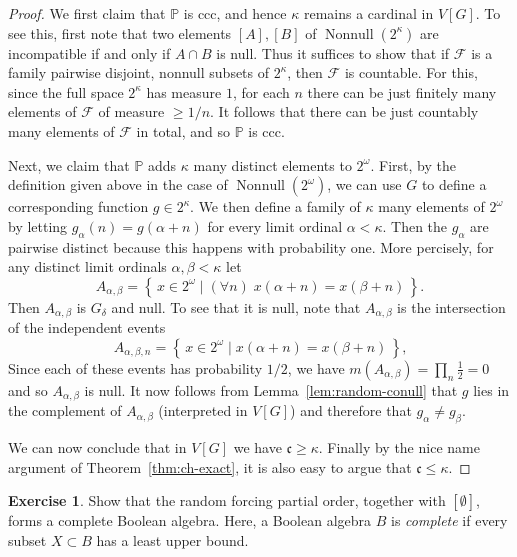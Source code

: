 \documentclass[11pt,oneside]{amsbook}
\newcommand{\set}[1]{\left\{\,#1\,\right\}}
\newcommand{\PP}{\mathbb P}
\DeclareMathOperator{\Nonnull}{Nonnull}
\theoremstyle{definition}
\newtheorem{exercise}{Exercise}[section]
\theoremstyle{plain}
\theoremstyle{definition}
\theoremstyle{remark}
\numberwithin{equation}{section}
\numberwithin{figure}{section}
\begin{document}
\begin{proof}
  We first claim that $\PP$ is ccc, and hence $\kappa$ remains a cardinal in $V[G]$. To see this, first note that two elements $[A],[B]$ of $\Nonnull(2^\kappa)$ are incompatible if and only if $A\cap B$ is null. Thus it suffices to show that if $\mathcal F$ is a family pairwise disjoint, nonnull subsets of $2^\kappa$, then $\mathcal F$ is countable. For this, since the full space $2^\kappa$ has measure $1$, for each $n$ there can be just finitely many elements of $\mathcal F$ of measure $\geq1/n$. It follows that there can be just countably many elements of $\mathcal F$ in total, and so $\PP$ is ccc.

  Next, we claim that $\PP$ adds $\kappa$ many distinct elements to $2^\omega$. First, by the definition given above in the case of $\Nonnull(2^\omega)$, we can use $G$ to define a corresponding function $g\in2^\kappa$. We then define a family of $\kappa$ many elements of $2^\omega$ by letting $g_\alpha(n)=g(\alpha+n)$ for every limit ordinal $\alpha<\kappa$. Then the $g_\alpha$ are pairwise distinct because this happens with probability one. More percisely, for any distinct limit ordinals $\alpha,\beta<\kappa$ let
  \[A_{\alpha,\beta}=\set{x\in2^\omega\mid(\forall n)\;x(\alpha+n)=x(\beta+n)}\text{.}
  \]
  Then $A_{\alpha,\beta}$ is $G_\delta$ and null. To see that it is null, note that $A_{\alpha,\beta}$ is the intersection of the independent events
  \[A_{\alpha,\beta,n}=\set{x\in2^\omega\mid x(\alpha+n)=x(\beta+n)}\text{,}
  \]
  Since each of these events has probability $1/2$, we have $m(A_{\alpha,\beta})=\prod_n\frac12=0$ and so $A_{\alpha,\beta}$ is null. It now follows from Lemma~\ref{lem:random-conull} that $g$ lies in the complement of $A_{\alpha,\beta}$ (interpreted in $V[G]$) and therefore that $g_\alpha\neq g_\beta$.

  We can now conclude that in $V[G]$ we have $\mathfrak c\geq\kappa$. Finally by the nice name argument of Theorem~\ref{thm:ch-exact}, it is also easy to argue that $\mathfrak c\leq\kappa$.
\end{proof}

\begin{exercise}
  Show that the random forcing partial order, together with $[\emptyset]$, forms a complete Boolean algebra. Here, a Boolean algebra $B$ is \emph{complete} if every subset $X\subset B$ has a least upper bound.
\end{exercise}


\end{document}
